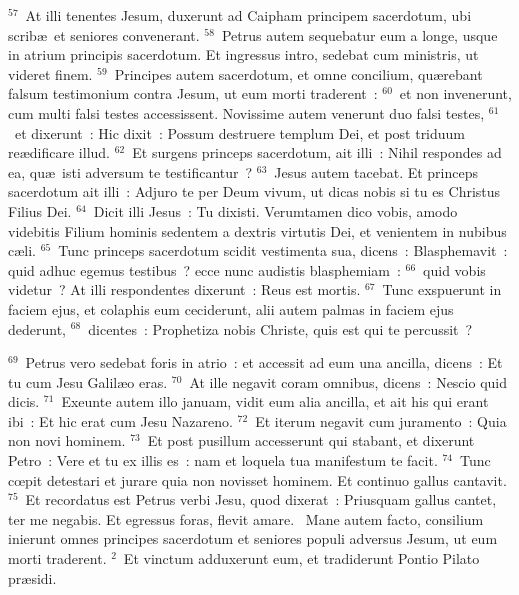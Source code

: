 ${}^{57}$~At illi tenentes Jesum, duxerunt ad Caipham principem sacerdotum, ubi scrib\ae\ et seniores convenerant.
${}^{58}$~Petrus autem sequebatur eum a longe, usque in atrium principis sacerdotum. Et ingressus intro, sedebat cum ministris, ut videret finem.
${}^{59}$~Principes autem sacerdotum, et omne concilium, qu\ae rebant falsum testimonium contra Jesum, ut eum morti traderent~:
${}^{60}$~et non invenerunt, cum multi falsi testes accessissent. Novissime autem venerunt duo falsi testes,
${}^{61}$~et dixerunt~: Hic dixit~: Possum destruere templum Dei, et post triduum re\ae dificare illud.
${}^{62}$~Et surgens princeps sacerdotum, ait illi~: Nihil respondes ad ea, qu\ae\ isti adversum te testificantur~?
${}^{63}$~Jesus autem tacebat. Et princeps sacerdotum ait illi~: Adjuro te per Deum vivum, ut dicas nobis si tu es Christus Filius Dei.
${}^{64}$~Dicit illi Jesus~: Tu dixisti. Verumtamen dico vobis, amodo videbitis Filium hominis sedentem a dextris virtutis Dei, et venientem in nubibus c\ae li.
${}^{65}$~Tunc princeps sacerdotum scidit vestimenta sua, dicens~: Blasphemavit~: quid adhuc egemus testibus~? ecce nunc audistis blasphemiam~:
${}^{66}$~quid vobis videtur~? At illi respondentes dixerunt~: Reus est mortis.
${}^{67}$~Tunc exspuerunt in faciem ejus, et colaphis eum ceciderunt, alii autem palmas in faciem ejus dederunt,
${}^{68}$~dicentes~: Prophetiza nobis Christe, quis est qui te percussit~?


${}^{69}$~Petrus vero sedebat foris in atrio~: et accessit ad eum una ancilla, dicens~: Et tu cum Jesu Galil\ae o eras.
${}^{70}$~At ille negavit coram omnibus, dicens~: Nescio quid dicis.
${}^{71}$~Exeunte autem illo januam, vidit eum alia ancilla, et ait his qui erant ibi~: Et hic erat cum Jesu Nazareno.
${}^{72}$~Et iterum negavit cum juramento~: Quia non novi hominem.
${}^{73}$~Et post pusillum accesserunt qui stabant, et dixerunt Petro~: Vere et tu ex illis es~: nam et loquela tua manifestum te facit.
${}^{74}$~Tunc cœpit detestari et jurare quia non novisset hominem. Et continuo gallus cantavit.
${}^{75}$~Et recordatus est Petrus verbi Jesu, quod dixerat~: Priusquam gallus cantet, ter me negabis. Et egressus foras, flevit amare.
~Mane autem facto, consilium inierunt omnes principes sacerdotum et seniores populi adversus Jesum, ut eum morti traderent.
${}^{2}$~Et vinctum adduxerunt eum, et tradiderunt Pontio Pilato pr\ae sidi.


